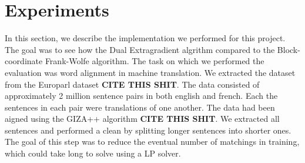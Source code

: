 \section{Experiments}
In this section, we describe the implementation we performed for this project. The goal was to see how the Dual Extragradient algrithm compared to the Block-coordinate Frank-Wolfe algorithm. The task on which we performed the evaluation was word alignment in machine translation. We extracted the dataset from the Europarl dataset \textbf{CITE THIS SHIT}. The data consisted of approximately 2 million sentence pairs in both english and french. Each the sentences in each pair were translations of one another. The data had been aigned using the GIZA++ algorithm \textbf{CITE THIS SHIT}. We extracted all sentences and performed a clean by splitting longer sentences into shorter ones. The goal of this step was to reduce the eventual number of matchings in training, which could take long to solve using a LP solver. 

